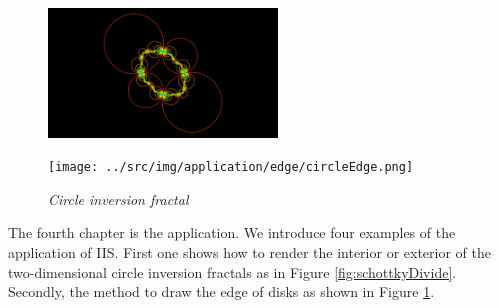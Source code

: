 \documentclass[uplatex, dvipdfmx]{article}
\begin{document}
\begin{figure}[htbp]
 \begin{minipage}[t]{0.5\hsize}
  \center
  \includegraphics[height=1.35in, keepaspectratio]{../src/img/application/edge/circles.png}
  \subcaption{\textit{}}
  \label{}
  \hspace*{\fill}
 \end{minipage}
 \begin{minipage}[t]{0.5\hsize}
  \center
  \texttt{[image: ../src/img/application/edge/circleEdge.png]}
  \subcaption{\textit{}}
  \label{}
  \hspace*{\fill}
 \end{minipage}
 \caption{\textit{Circle inversion fractal}}
 \label{fig:circleEdge}
\end{figure}

The fourth chapter is the application.
We introduce four examples of the application of IIS.
First one shows how to render the interior or exterior of the
two-dimensional circle inversion fractals as in Figure \ref{fig:schottkyDivide}.
Secondly, the method to draw the edge of disks as shown in
Figure \ref{fig:circleEdge}.
\end{document}
